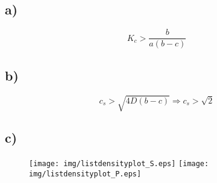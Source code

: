 \subsection{a)}

\begin{equation}
K_c>\frac{b}{a(b-c)}
\end{equation}
\subsection{b)}


\begin{equation}
c_s>\sqrt{4D(b-c)} \Rightarrow c_s>\sqrt{2}
\end{equation}

\subsection{c)}

\begin{figure}[h]
    \centering
    \texttt{[image: img/listdensityplot\_S.eps]}
    \texttt{[image: img/listdensityplot\_P.eps]}
  \caption{}
\end{figure}
